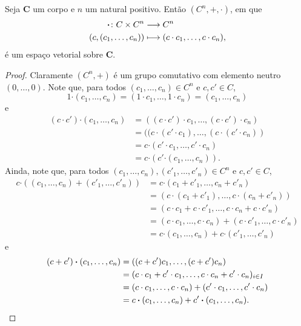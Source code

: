\begin{proposition}
Seja $\bm C$ um corpo e $n$ um natural positivo. Então $(C^n,+,\bm\cdot)$, em que
	\begin{align*}
	{\bm\cdot}\colon {C \times C^n} &\longrightarrow {C^n} \\{(c,(c_1,\ldots,c_n))} &\longmapsto (c \cdot c_1,\ldots,c \cdot c_n),
	\end{align*}
é um espaço vetorial sobre $\bm C$.
\end{proposition}
\begin{proof}
	Claramente $(C^n,+)$ é um grupo comutativo com elemento neutro $(0,\ldots,0)$. Note que, para todos $(c_1,\ldots,c_n) \in C^n$ e $c,c' \in C$,
	\begin{equation*}
	1 \bm\cdot (c_1,\ldots,c_n) = (1 \cdot c_1,\ldots,1 \cdot c_n) = (c_1,\ldots,c_n)
	\end{equation*}
e
	\begin{align*}
	(c \cdot c') \bm\cdot (c_1,\ldots,c_n) &= ((c \cdot c') \cdot c_1, \ldots, (c \cdot c') \cdot c_n) \\
	&= ((c \cdot (c' \cdot c_1), \ldots, (c \cdot (c' \cdot c_n)) \\
	&= c \bm\cdot (c' \cdot c_1,\ldots,c' \cdot c_n) \\
	&= c \bm\cdot (c' \bm\cdot (c_1,\ldots,c_n)).
	\end{align*}
	Ainda, note que, para todos $(c_1,\ldots,c_n), (c'_1,\ldots,c'_n) \in C^n$ e $c,c' \in C$,
	\begin{align*}
	c \bm\cdot ((c_1,\ldots,c_n) + (c'_1,\ldots,c'_n)) &= c \bm\cdot (c_1+c'_1,\ldots,c_n+c'_n) \\
	&= (c \cdot (c_1+c'_1),\ldots,c \cdot (c_n+c'_n)) \\
	&= (c \cdot c_1 + c \cdot c'_1,\ldots,c \cdot c_n + c \cdot c'_n) \\
	&= (c \cdot c_1,\ldots,c \cdot c_n) + (c \cdot c'_1,\ldots,c \cdot c'_n) \\
	&= c \bm\cdot (c_1,\ldots,c_n) + c \bm\cdot (c'_1,\ldots,c'_n)
	\end{align*}
e
	\begin{align*}
	(c+c') \bm\cdot (c_1,\ldots,c_n) &= ((c+c')c_1,\ldots,(c+c')c_n) \\
	&= (c \cdot c_1 + c' \cdot c_1,\ldots,c \cdot c_n + c' \cdot c_n)_{i \in I} \\
	&= (c \cdot c_1,\ldots,c \cdot c_n) + (c' \cdot c_1,\ldots,c' \cdot c_n) \\
	&= c \bm\cdot (c_1,\ldots,c_n) + c' \bm\cdot (c_1,\ldots,c_n).  \qedhere
	\end{align*}
\end{proof}

